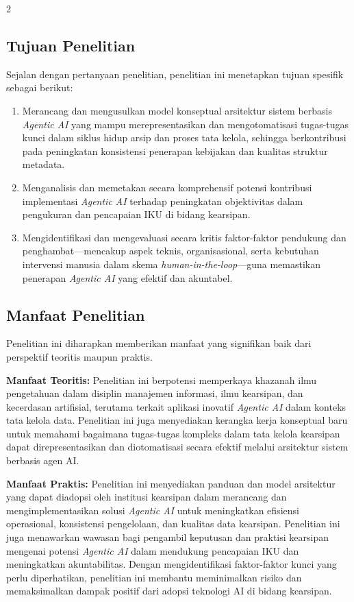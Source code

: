 \documentclass[12pt,a4paper]{article}
\begin{document}
\begin{multicols}{2}
\subsection{Tujuan Penelitian}

Sejalan dengan pertanyaan penelitian, penelitian ini menetapkan tujuan spesifik sebagai berikut:

\begin{enumerate}
\item Merancang dan mengusulkan model konseptual arsitektur sistem berbasis \emph{Agentic AI} yang mampu merepresentasikan dan mengotomatisasi tugas-tugas kunci dalam siklus hidup arsip dan proses tata kelola, sehingga berkontribusi pada peningkatan konsistensi penerapan kebijakan dan kualitas struktur metadata.

\item Menganalisis dan memetakan secara komprehensif potensi kontribusi implementasi \emph{Agentic AI} terhadap peningkatan objektivitas dalam pengukuran dan pencapaian IKU di bidang kearsipan.

\item Mengidentifikasi dan mengevaluasi secara kritis faktor-faktor pendukung dan penghambat---mencakup aspek teknis, organisasional, serta kebutuhan intervensi manusia dalam skema \emph{human-in-the-loop}---guna memastikan penerapan \emph{Agentic AI} yang efektif dan akuntabel.
\end{enumerate}

\subsection{Manfaat Penelitian}

Penelitian ini diharapkan memberikan manfaat yang signifikan baik dari perspektif teoritis maupun praktis.

\textbf{Manfaat Teoritis:} Penelitian ini berpotensi memperkaya khazanah ilmu pengetahuan dalam disiplin manajemen informasi, ilmu kearsipan, dan kecerdasan artifisial, terutama terkait aplikasi inovatif \emph{Agentic AI} dalam konteks tata kelola data. Penelitian ini juga menyediakan kerangka kerja konseptual baru untuk memahami bagaimana tugas-tugas kompleks dalam tata kelola kearsipan dapat direpresentasikan dan diotomatisasi secara efektif melalui arsitektur sistem berbasis agen AI.

\textbf{Manfaat Praktis:} Penelitian ini menyediakan panduan dan model arsitektur yang dapat diadopsi oleh institusi kearsipan dalam merancang dan mengimplementasikan solusi \emph{Agentic AI} untuk meningkatkan efisiensi operasional, konsistensi pengelolaan, dan kualitas data kearsipan. Penelitian ini juga menawarkan wawasan bagi pengambil keputusan dan praktisi kearsipan mengenai potensi \emph{Agentic AI} dalam mendukung pencapaian IKU dan meningkatkan akuntabilitas. Dengan mengidentifikasi faktor-faktor kunci yang perlu diperhatikan, penelitian ini membantu meminimalkan risiko dan memaksimalkan dampak positif dari adopsi teknologi AI di bidang kearsipan.


\end{multicols}
\end{document}
